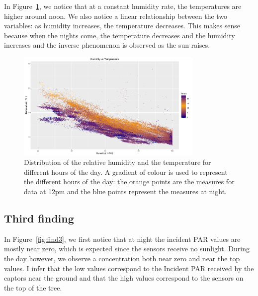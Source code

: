 \documentclass[11pt]{article}\usepackage[]{graphicx}\usepackage[]{color}
\begin{document}
In Figure~\ref{fig:find2}, we notice that at a constant humidity rate, the temperatures are higher around noon. We also notice a linear relationship between the two variables: as humidity increases, the temperature decreases. This makes sense because when the nights come, the temperature decreases and the humidity increases and the inverse phenomenon is observed as the sun raises. 
\begin{figure}
  \centering
    \includegraphics[width=0.8\textwidth]{Find2}
  \caption{Distribution of the relative humidity and the temperature for different hours of the day. A gradient of colour is used to represent the different hours of the day: the orange points are the measures for data at 12pm and the blue points represent the measures at night.}
  \label{fig:find2}
\end{figure}


\subsection{Third finding}

In Figure~\ref{fig:find3}, we first notice that at night the incident PAR values are mostly near zero, which is expected since the sensors receive no sunlight. During the day however, we observe a concentration both near zero and near the top values. I infer that the low values correspond to the Incident PAR received by the captors near the ground and that the high values correspond to the sensors on the top of the tree. 
\end{document}
